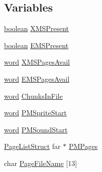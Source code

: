 \subsection*{Variables}
\begin{DoxyCompactItemize}
\item 
\hyperlink{ID__HEAD_8H_a7c6368b321bd9acd0149b030bb8275ed}{boolean} \hyperlink{ID__PM_8H_a5f57a31d9e6a665cbebbb452d757de61}{XMSPresent}
\item 
\hyperlink{ID__HEAD_8H_a7c6368b321bd9acd0149b030bb8275ed}{boolean} \hyperlink{ID__PM_8H_ab35be0811b0150bb1a52eaad6d3d6340}{EMSPresent}
\item 
\hyperlink{ID__HEAD_8H_abad51e07ab6d26bec9f1f786c8d65bcd}{word} \hyperlink{ID__PM_8H_ac00fcb63e290e188116ecc3f43ec3f93}{XMSPagesAvail}
\item 
\hyperlink{ID__HEAD_8H_abad51e07ab6d26bec9f1f786c8d65bcd}{word} \hyperlink{ID__PM_8H_a0b3caaa008ec8ab4b8486880a825bad0}{EMSPagesAvail}
\item 
\hyperlink{ID__HEAD_8H_abad51e07ab6d26bec9f1f786c8d65bcd}{word} \hyperlink{ID__PM_8H_af385634b054d3e3d81d85865b3d7e71e}{ChunksInFile}
\item 
\hyperlink{ID__HEAD_8H_abad51e07ab6d26bec9f1f786c8d65bcd}{word} \hyperlink{ID__PM_8H_ac15156742487c3e546be66ffc29b4473}{PMSpriteStart}
\item 
\hyperlink{ID__HEAD_8H_abad51e07ab6d26bec9f1f786c8d65bcd}{word} \hyperlink{ID__PM_8H_a4274c51cf3dd5e7fd0c4562376e91d3b}{PMSoundStart}
\item 
\hyperlink{structPageListStruct}{PageListStruct} far $\ast$ \hyperlink{ID__PM_8H_aac6e5bfd3ae3497c8b721679578d73f1}{PMPages}
\item 
char \hyperlink{ID__PM_8H_a3d2a1c78f3a8c484f8b2ed0cbe566453}{PageFileName} \mbox{[}13\mbox{]}
\end{DoxyCompactItemize}


